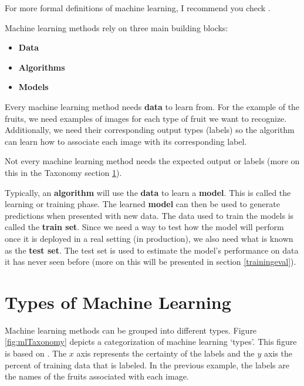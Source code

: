\documentclass[
  11pt,
]{krantz}
\makeatletter
\providecommand{\tightlist}{%
  \setlength{\itemsep}{0pt}\setlength{\parskip}{0pt}}
\newenvironment{kframe}{%
\medskip{}
\setlength{\fboxsep}{.8em}
 \def\at@end@of@kframe{}%
 \ifinner\ifhmode%
  \def\at@end@of@kframe{\end{minipage}}%
  \begin{minipage}{\columnwidth}%
 \fi\fi%
 \def\FrameCommand##1{\hskip\@totalleftmargin \hskip-\fboxsep
 \colorbox{shadecolor}{##1}\hskip-\fboxsep
     \hskip-\linewidth \hskip-\@totalleftmargin \hskip\columnwidth}%
 \MakeFramed {\advance\hsize-\width
   \@totalleftmargin\z@ \linewidth\hsize
   \@setminipage}}%
 {\par\unskip\endMakeFramed%
 \at@end@of@kframe}
\newenvironment{rmdblock}[1]
  {
  \begin{itemize}
  \renewcommand{\labelitemi}{
    \raisebox{-.7\height}[0pt][0pt]{
      {\setkeys{Gin}{width=3em,keepaspectratio}\texttt{[image: images/icons/\#1]}}
    }
  }
  \setlength{\fboxsep}{1em}
  \begin{kframe}
  \item
  }
  {
  \end{kframe}
  \end{itemize}
  }
\newenvironment{rmdinfo}
  {\begin{rmdblock}{info}}
  {\end{rmdblock}}
\makeatother
\begin{document}
\begin{rmdinfo}
For more formal definitions of machine learning, I recommend you check \citep{kononenko2007}.
\end{rmdinfo}

Machine learning methods rely on three main building blocks:

\begin{itemize}
\tightlist
\item
  \textbf{Data}
\item
  \textbf{Algorithms}
\item
  \textbf{Models}
\end{itemize}

Every machine learning method needs \textbf{data} to learn from. For the example of the fruits, we need examples of images for each type of fruit we want to recognize. Additionally, we need their corresponding output types (labels) so the algorithm can learn how to associate each image with its corresponding label.

\begin{rmdinfo}
Not every machine learning method needs the expected output or labels (more on this in the Taxonomy section \ref{taxonomy}).
\end{rmdinfo}

Typically, an \textbf{algorithm} will use the \textbf{data} to learn a \textbf{model}. This is called the learning or training phase. The learned \textbf{model} can then be used to generate predictions when presented with new data. The data used to train the models is called the \textbf{train set}. Since we need a way to test how the model will perform once it is deployed in a real setting (in production), we also need what is known as the \textbf{test set}. The test set is used to estimate the model's performance on data it has never seen before (more on this will be presented in section \ref{trainingeval}).

\hypertarget{taxonomy}{%
\section{Types of Machine Learning}\label{taxonomy}}

Machine learning methods can be grouped into different types. Figure \ref{fig:mlTaxonomy} depicts a categorization of machine learning `types'. This figure is based on \citep{biecek2012}. The \(x\) axis represents the certainty of the labels and the \(y\) axis the percent of training data that is labeled. In the previous example, the labels are the names of the fruits associated with each image.
\end{document}
